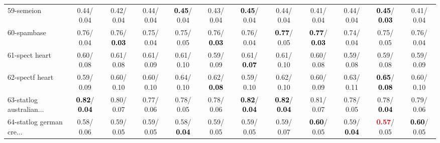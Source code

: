 \begin{table}[h]
\begin{center}
{\begin{tabular}{lc|c|c|c|c|c|c|c|c|c|c}
59-semeion &   0.44/  0.04 &   0.42/  0.04 &   0.44/  0.04 & \textcolor{black}{\textbf{  0.45}}/  0.04 &   0.43/  0.04 & \textcolor{black}{\textbf{  0.45}}/  0.04 &   0.44/  0.04 &   0.41/  0.04 &   0.44/  0.04 & \textcolor{black}{\textbf{  0.45}}/\textcolor{black}{\textbf{  0.03}} &   0.41/  0.04 \\
60-spambase &   0.76/  0.04 &   0.76/\textcolor{black}{\textbf{  0.03}} &   0.75/  0.04 &   0.75/  0.05 &   0.76/\textcolor{black}{\textbf{  0.03}} &   0.76/  0.04 & \textcolor{black}{\textbf{  0.77}}/  0.05 & \textcolor{black}{\textbf{  0.77}}/\textcolor{black}{\textbf{  0.03}} &   0.74/  0.04 &   0.75/  0.05 &   0.76/  0.04 \\ \hline
61-spect heart &   0.60/  0.08 &   0.61/  0.08 &   0.61/  0.09 &   0.61/  0.10 &   0.59/  0.09 &   0.61/\textcolor{black}{\textbf{  0.07}} &   0.61/  0.10 &   0.60/  0.08 &   0.59/  0.08 &   0.59/  0.08 &   0.59/  0.09 \\
62-spectf heart &   0.59/  0.09 &   0.60/  0.10 &   0.60/  0.10 &   0.64/  0.10 &   0.62/\textcolor{black}{\textbf{  0.08}} &   0.59/  0.10 &   0.62/  0.10 &   0.60/  0.09 &   0.63/  0.11 & \textcolor{black}{\textbf{  0.65}}/\textcolor{black}{\textbf{  0.08}} &   0.60/  0.10 \\
63-statlog australian... & \textcolor{black}{\textbf{  0.82}}/\textcolor{black}{\textbf{  0.04}} &   0.80/  0.07 &   0.77/  0.06 &   0.78/  0.05 &   0.78/  0.06 & \textcolor{black}{\textbf{  0.82}}/\textcolor{black}{\textbf{  0.04}} & \textcolor{black}{\textbf{  0.82}}/\textcolor{black}{\textbf{  0.04}} &   0.81/  0.07 &   0.78/  0.05 &   0.78/\textcolor{black}{\textbf{  0.04}} &   0.79/  0.06 \\
64-statlog german cre... &   0.58/  0.06 &   0.59/  0.05 &   0.59/  0.05 &   0.58/\textcolor{black}{\textbf{  0.04}} &   0.59/  0.05 &   0.59/  0.05 &   0.59/  0.07 & \textcolor{black}{\textbf{  0.60}}/  0.05 &   0.59/\textcolor{black}{\textbf{  0.04}} & \textcolor{red}{\textbf{  0.57}}/  0.05 & \textcolor{black}{\textbf{  0.60}}/  0.05 \\\end{tabular}}\label{stratsBalAcc1bIELM}
\end{center}
\end{table}
